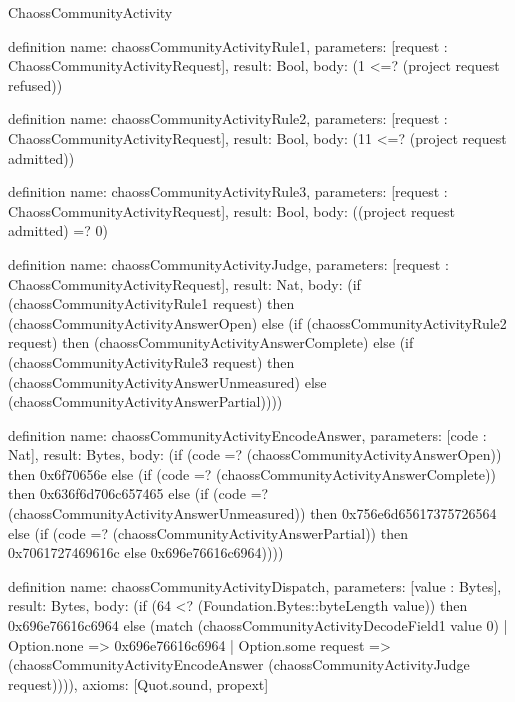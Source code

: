 \begin{lexlean}{ChaossCommunityActivity}
\begin{semanticmodule}
definition{
  name: chaossCommunityActivityRule1,
  parameters: [request : ChaossCommunityActivityRequest],
  result: Bool,
  body: (1 <=? (project request refused))
}

definition{
  name: chaossCommunityActivityRule2,
  parameters: [request : ChaossCommunityActivityRequest],
  result: Bool,
  body: (11 <=? (project request admitted))
}

definition{
  name: chaossCommunityActivityRule3,
  parameters: [request : ChaossCommunityActivityRequest],
  result: Bool,
  body: ((project request admitted) =? 0)
}

definition{
  name: chaossCommunityActivityJudge,
  parameters: [request : ChaossCommunityActivityRequest],
  result: Nat,
  body: (if (chaossCommunityActivityRule1 request) then (chaossCommunityActivityAnswerOpen) else (if (chaossCommunityActivityRule2 request) then (chaossCommunityActivityAnswerComplete) else (if (chaossCommunityActivityRule3 request) then (chaossCommunityActivityAnswerUnmeasured) else (chaossCommunityActivityAnswerPartial))))
}

definition{
  name: chaossCommunityActivityEncodeAnswer,
  parameters: [code : Nat],
  result: Bytes,
  body: (if (code =? (chaossCommunityActivityAnswerOpen)) then 0x6f70656e else (if (code =? (chaossCommunityActivityAnswerComplete)) then 0x636f6d706c657465 else (if (code =? (chaossCommunityActivityAnswerUnmeasured)) then 0x756e6d65617375726564 else (if (code =? (chaossCommunityActivityAnswerPartial)) then 0x7061727469616c else 0x696e76616c6964))))
}

definition{
  name: chaossCommunityActivityDispatch,
  parameters: [value : Bytes],
  result: Bytes,
  body: (if (64 <? (Foundation.Bytes::byteLength value)) then 0x696e76616c6964 else (match (chaossCommunityActivityDecodeField1 value 0)
    | Option.none => 0x696e76616c6964
    | Option.some request => (chaossCommunityActivityEncodeAnswer (chaossCommunityActivityJudge request)))),
  axioms: [Quot.sound, propext]
}
\end{semanticmodule}
\end{lexlean}
